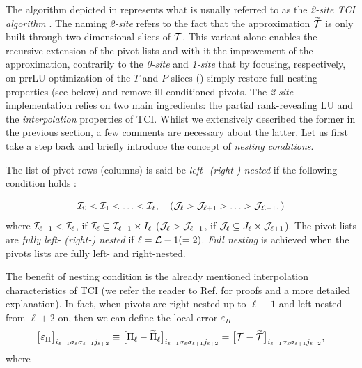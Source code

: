 The algorithm depicted in  represents what is usually referred to as the \textit{2-site TCI algorithm} \cite{Fernandez2024}. The naming \textit{2-site} refers to the fact that the approximation $\widetilde{\mathcal{T}}$ is only built through two-dimensional slices of $\mathcal{T}$. This variant alone enables the recursive extension of the pivot lists and with it the improvement of the approximation, contrarily to the \textit{0-site} and \textit{1-site} that by focusing, respectively, on prrLU optimization of the $T$ and $P$ slices () simply restore full nesting properties (see below) and remove ill-conditioned pivots. The \textit{2-site} implementation relies on two main ingredients: the partial rank-revealing LU and the \textit{interpolation} properties of TCI. Whilst we extensively described the former in the previous section, a few comments are necessary about the latter. Let us first take a step back and briefly introduce the concept of \textit{nesting conditions}. 

The list of pivot rows (columns) is said be \textit{left- (right-) nested} if the following condition holds \cite{Oseledets2011, Dolgov2020}:

\begin{equation}
	\label{eq:Nesting}
	\mathcal{I}_0 <  \mathcal{I}_1  < \ldots < \mathcal{I}_{\ell} ,\quad (\mathcal{J}_{\ell} > \mathcal{J}_{\ell+1} > \ldots > \mathcal{J}_{\mathcal{L}+1} ,)
\end{equation}
where $\mathcal{I}_{\ell -1 } <\mathcal{I}_\ell$,  if
$\mathcal{I}_\ell \subseteq \mathcal{I}_{\ell -1 } \times 
I_\ell $ ($\mathcal{J}_{\ell} > \mathcal{J}_{\ell +1}$,  if
$\mathcal{J}_\ell \subseteq J_\ell \times \mathcal{J}_{\ell + 1 }$). The pivot lists are \textit{fully left- (right-) nested} if $\ell = \mathcal{L} - 1 (=2)$. \textit{Full nesting} is achieved when the pivots lists are fully left- and right-nested.

The benefit of nesting condition is the already mentioned interpolation characteristics of TCI (we refer the reader to Ref. \cite{Fernandez2022, Fernandez2024} for proofs and a more detailed explanation). In fact, when pivots are right-nested up to $\ell -1$ and left-nested from $\ell +2$ on, then we can define the local error $\varepsilon_\Pi$ 
\begin{equation}
	\label{eq:ErrorPiIsErrorT}
	\bigl[\varepsilon_\Pi\bigr]_{i_{\ell-1}\sigma_\ell \sigma_{\ell +1} j_{\ell +2 }} \equiv \bigl[ \Pi_\ell - \widetilde{\Pi}_\ell\bigr]_{i_{\ell-1}\sigma_\ell \sigma_{\ell +1} j_{\ell +2 }} 
	= 
   \bigl[ \mathcal{T}-\widetilde{\mathcal{T}}\bigr]_{i_{\ell-1}\sigma_\ell \sigma_{\ell +1} j_{\ell+2}},
 \end{equation}
where 

